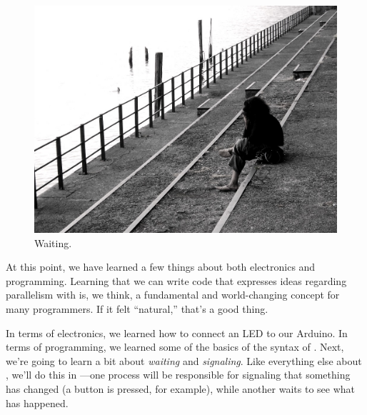 \begin{figure}
	  \begin{center}
	    \includegraphics[width=0.9\linewidth]{images/waiting}
			\captionsetup{labelformat=empty,justification=centering}
	    \caption{Waiting.}
	    \label{medio:waiting}
  \end{center}
\end{figure}

At this point, we have learned a few things about both electronics and programming. Learning that we can write code that expresses ideas regarding parallelism with \PAR is, we think, a fundamental and world-changing concept for many programmers. If it felt ``natural,'' that's a good thing. 

In terms of electronics, we learned how to connect an LED to our Arduino. In terms of programming, we learned some of the basics of the syntax of \occam. Next, we're going to learn a bit about {\em waiting} and {\em signaling}. Like everything else about \plumbing, we'll do this in \PARallel---one process will be responsible for signaling that something has changed (a button is pressed, for example), while another waits to see what has happened.




